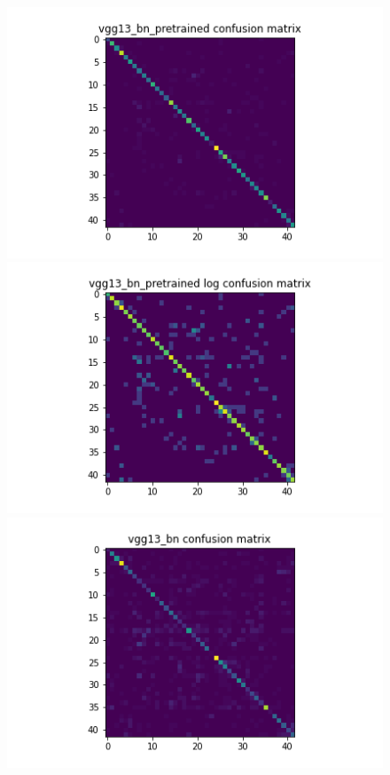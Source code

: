 \begin{figure}[H]

  \begin{minipage}[t]{.5\linewidth}
    \centering
    \includegraphics[width=1.2\textwidth]{figs/conf_matrix/vgg13_bn_pretrained_conf.png}
  \end{minipage}
  \hfill
  \begin{minipage}[t]{.5\linewidth}
    \centering
    \includegraphics[width=1.2\textwidth]{figs/conf_matrix/vgg13_bn_pretrained_log_conf.png}
  \end{minipage}
  \vfill
  \begin{minipage}[b]{.5\linewidth}
    \centering
    \includegraphics[width=1.2\textwidth]{figs/conf_matrix/vgg13_bn_conf.png}

\end{minipage}
\end{figure}
